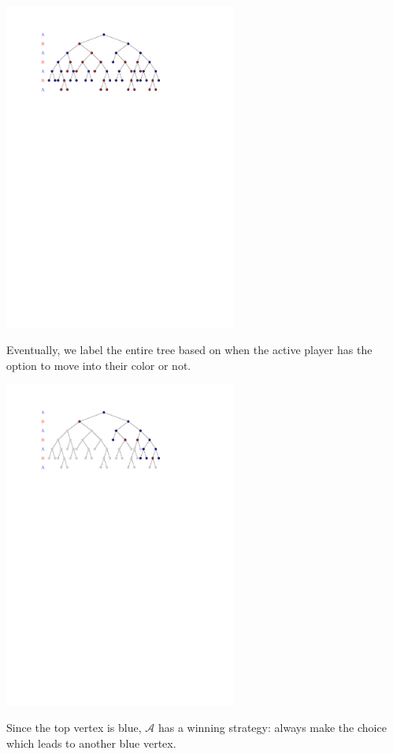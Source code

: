 \documentclass{beamer}
\theoremstyle{theorem}
\theoremstyle{definition}
\newcommand{\<}{\langle}
\renewcommand{\>}{\rangle}
\newcommand{\pl}[1]{\mathscr{#1}}
\begin{document}
\begin{frame}
  \centerline{\includegraphics[width=3in]{decisionTree4.pdf}}

  \vspace{1em}

  Eventually, we label the entire tree based on when the active player has
  the option to move into their color or not.
\end{frame}

\begin{frame}
  \centerline{\includegraphics[width=3in]{decisionTree5.pdf}}

  \vspace{1em}

  Since the top vertex is blue, $\pl A$ has a winning strategy: always make
  the choice which leads to another blue vertex.
\end{frame}
\end{document}
